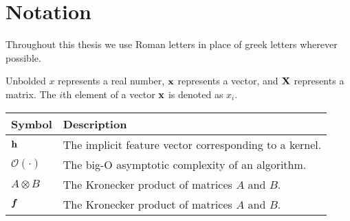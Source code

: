 
\inbpdocument

\chapter*{Notation}
\label{ch:notation}

Throughout this thesis we use Roman letters in place of greek letters wherever possible.

Unbolded $x$ represents a real number, ${\bf{x}}$ represents a vector, and $\mathbf{X}$ represents a matrix.
The $i$th element of a vector ${\bf{x}}$ is denoted as $x_i$.

\begin{tabular}{ll}
Symbol \quad     & Description \\
\hline
${\bf{h}}$       & The implicit feature vector corresponding to a kernel. \\
$\mathcal{O}(\cdot)$ & The big-O asymptotic complexity of an algorithm. \\
$A \otimes B$ & The Kronecker product of matrices $A$ and $B$. \\
$\boldsymbol{f}$ & The Kronecker product of matrices $A$ and $B$. \\
\end{tabular}

\outbpdocument{
}


